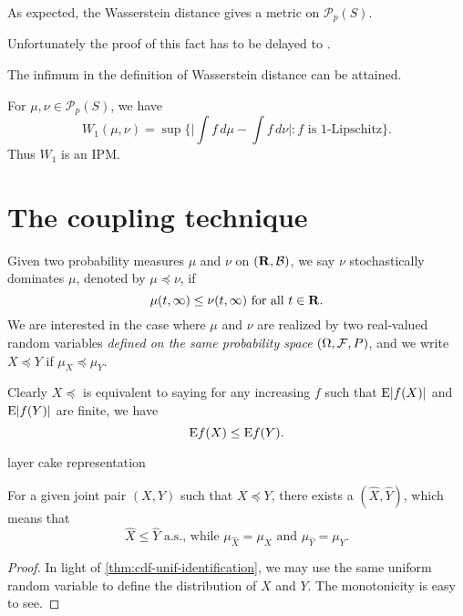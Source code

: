 \begin{fact}
    As expected, the Wasserstein distance gives a metric on $\mathcal P_p(S)$.
\end{fact}

Unfortunately the proof of this fact has to be delayed to . 


\begin{fact}
    The infimum in the definition of Wasserstein distance can be attained. 
\end{fact}

\begin{namedthm} \label{thm:duality-W1}
    For $\mu,\nu \in \mathcal P_p(S)$, we have \[
        W_1(\mu,\nu) = \sup\biggl\{\biggl\vert\int f\,d\mu  - \int f\,d\nu\biggr\vert : f \text{ is }1\text{-Lipschitz}\biggr\}.
    \] Thus $W_1$ is an IPM.
\end{namedthm}

\section{The coupling technique}

Given two probability measures $\mu$ and $\nu$ on $(\mathbf{R},\mathcal{B})$, we say $\nu$ stochastically dominates $\mu$, denoted by $\mu \preceq \nu$, if \[
    \mu(t,\infty) \leq \nu(t,\infty) \text{ for all } t \in \mathbf{R}. 
\] We are interested in the case where $\mu$ and $\nu$ are realized by two real-valued random variables \emph{defined on the same probability space} $(\Omega,\mathcal{F},P)$, and we write $X \preceq Y$ if $\mu_X \preceq \mu_Y$.

Clearly $X \preceq $ is equivalent to saying for any increasing $f$ such that $\mathop{}\!\mathrm{E}\lvert f(X) \rvert$ and $\mathop{}\!\mathrm{E}\lvert f(Y) \rvert$ are finite, we have \[
    \mathop{}\!\mathrm{E} f(X) \leq \mathop{}\!\mathrm{E} f(Y).
\]

layer cake representation

\begin{namedthm}
    For a given joint pair $(X,Y)$ such that $X \preceq Y$, there exists a  $(\widehat X,\widehat Y)$, which means that \[
    \widehat X \leq \widehat Y\text{ a.s., while } \mu_{\widehat X} = \mu_X \text{ and } \mu_{\widehat Y} = \mu_Y.
\]
\end{namedthm}
\begin{proof}
    In light of \cref{thm:cdf-unif-identification}, we may use the same uniform random variable to define the distribution of $X$ and $Y$. The monotonicity is easy to see.
\end{proof}

